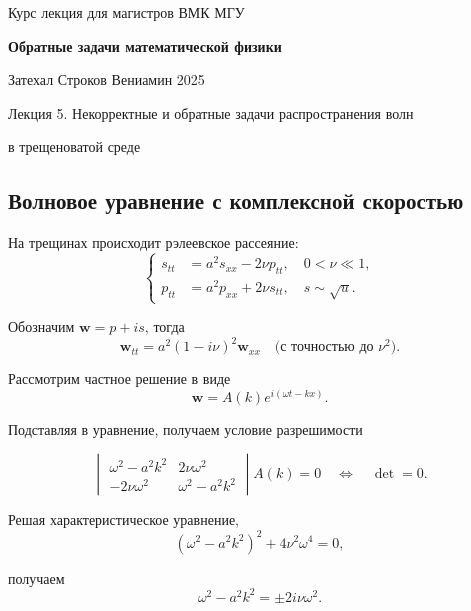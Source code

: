 \documentclass{article}
\begin{document}
\centerline{\large Курс лекция для магистров ВМК МГУ}
\centerline {\textbf{\LARGE Обратные задачи математической физики}}
\centerline {Затехал Строков Вениамин 2025}

\vspace{0.4cm}

\centerline{\LARGE 	Лекция 5. Некорректные и обратные задачи распространения волн}
\centerline{\LARGE 	в трещеноватой среде}

\vspace{0.5cm}

\subsection*{Волновое уравнение с комплексной скоростью}


На трещинах происходит рэлеевское рассеяние:
$$\begin{cases}
    s_{tt} &= a^2 s_{xx} - 2 \nu p_{tt}, \quad 0 < \nu \ll 1, \\
    p_{tt} &= a^2 p_{xx} + 2 \nu s_{tt}, \quad s \sim \sqrt{
u}.
\end{cases}$$

Обозначим $\mathbf{w} = p + i s$, тогда
\begin{equation*}
    \mathbf{w}_{tt} = a^2 (1 - i \nu)^2 \mathbf{w}_{xx} \quad \text{(с точностью до } \nu^2 \text{)}.
\end{equation*}

Рассмотрим частное решение в виде
\begin{equation*}
    \mathbf{w} = A(k) e^{i(\omega t - kx)}.
\end{equation*}

Подставляя в уравнение, получаем условие разрешимости

\begin{equation*}
    \begin{vmatrix}
        \omega^2 - a^2 k^2 & 2\nu \omega^2 \\
        -2 \nu \omega^2 & \omega^2 - a^2 k^2
    \end{vmatrix}
    A(k) = 0 \quad \Leftrightarrow \quad \det = 0.
\end{equation*}

Решая характеристическое уравнение,
\begin{equation}
    (\omega^2 - a^2 k^2)^2 + 4 \nu^2 \omega^4 = 0,
    \label{characteristic}
\end{equation}

получаем
\begin{equation*}
    \omega^2 - a^2 k^2 = \pm 2 i \nu \omega^2.
\end{equation*}
\end{document}
